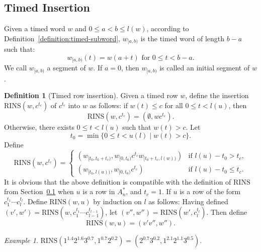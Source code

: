 \documentclass[10pt]{amsproc}
\theoremstyle{definition}
\newtheorem{definition}[theorem]{Definition}
\theoremstyle{remark}
\newtheorem{example}[theorem]{Example}
\newcommand{\rowins}{\mathrm{RINS}}
\begin{document}
\subsection{Timed Insertion}
\label{sec:timed-insertion}
Given a timed word $w$ and $0\leq a < b \leq l(w)$, according to Definition~\ref{definition:timed-subword}, $w_{[a, b)}$ is the timed word of length $b-a$ such that:
\begin{displaymath}
  w_{[a, b)}(t) = w(a+ t) \text{ for } 0\leq t<b-a.
\end{displaymath}
We call $w_{[a,b)}$ a segment of $w$.
If $a=0$, then $w_{[a,b)}$ is called an initial segment of $w$.
\begin{definition}[Timed row insertion]
  \label{definition:timed-row-insertion}
  Given a timed row $w$, define the insertion $\rowins(w, c^{t_c})$ of $c^{t_c}$ into $w$ as follows: if $w(t)\leq c$ for all $0\leq t < l(u)$, then
  \begin{displaymath}
    \rowins(w, c^{t_c}) = (\emptyset, wc^{t_c}).
  \end{displaymath}
  Otherwise, there exists $0\leq t < l(u)$ such that $w(t)>c$.
  Let
  \begin{displaymath}
    t_0 = \min\{0\leq t< u(l)\mid w(t)> c\}.
  \end{displaymath}
  Define
  \begin{displaymath}
    \rowins(w, c^{t_c}) =
    \begin{cases}
      (w_{[t_0, t_0+t_c)}, w_{[0, t_0)}c^{t_c} w_{[t_0+t_c, l(w))}) & \text{if } l(u) - t_0 > t_c,\\
      (w_{[t_0, l(u))}, w_{[0, t_0)} c^{t_c}) & \text{if } l(u) - t_0 \leq t_c.
    \end{cases}
  \end{displaymath}
  It is obvious that the above definition is compatible with the definition of $\rowins$ from Section~\ref{sec:timed-insertion} when $u$ is a row in $A_n^*$, and $t_c=1$.
  If $u$ is a row of the form $c_1^{t_1}\dotsb c_l^{t_l}$.
  Define $\rowins(w,u)$ by induction on $l$ as follows:
  Having defined $(v',w')=\rowins(w,c_1^{t_1}\dotsb c_{l-1}^{t_{l-1}})$,
  let $(v'',w'')=\rowins(w',c_l^{t_l})$.
  Then define
  \begin{displaymath}
    \rowins(w,u) = (v'v'', w'').
  \end{displaymath}
\end{definition}
\begin{example}
  \label{example:timed-row-ins}
  $\rowins(1^{1.4}2^{1.6}3^{0.7},1^{0.7}2^{0.2})=(2^{0.7}3^{0.2},1^{2.1}2^{1.1}3^{0.5})$.
\end{example}
\end{document}
